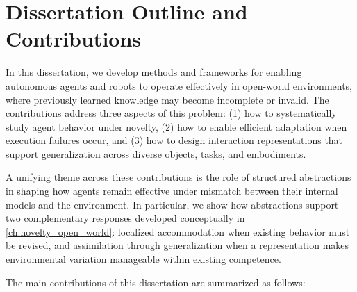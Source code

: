 \section{Dissertation Outline and Contributions}
\label{sec:contributions}

In this dissertation, we develop methods and frameworks for enabling autonomous agents and robots to operate effectively in open-world environments, where previously learned knowledge may become incomplete or invalid. The contributions address three aspects of this problem: (1) how to systematically study agent behavior under novelty, (2) how to enable efficient adaptation when execution failures occur, and (3) how to design interaction representations that support generalization across diverse objects, tasks, and embodiments.

A unifying theme across these contributions is the role of structured abstractions in shaping how agents remain effective under mismatch between their internal models and the environment. In particular, we show how abstractions support two complementary responses developed conceptually in \cref{ch:novelty_open_world}: localized accommodation when existing behavior must be revised, and assimilation through generalization when a representation makes environmental variation manageable within existing competence.

The main contributions of this dissertation are summarized as follows:

